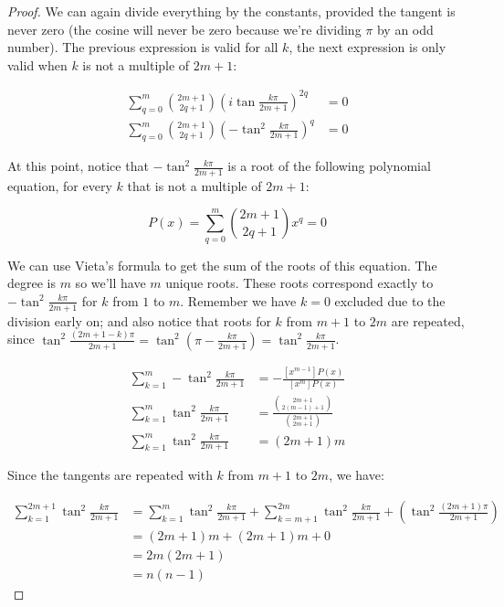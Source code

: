 \documentclass{letter}
\begin{document}
\begin{letter}{}
\begin{proof}
    We can again divide everything by the constants, provided the tangent is never zero (the cosine will never be zero because we're dividing $\pi$ by an odd number). The previous expression is valid for all $k$, the next expression is only valid when $k$ is not a multiple of $2m+1$:

  \begin{align*}
    \sum_{q=0}^{m}{2m+1\choose 2q+1}
      \left(i\tan\frac{k\pi}{2m+1}\right)^{2q} &=0 \\
    \sum_{q=0}^{m}{2m+1\choose 2q+1}
      \left(-\tan^2\frac{k\pi}{2m+1}\right)^{q} &=0 
  \end{align*}
       
  At this point, notice that $-\tan^2\frac{k\pi}{2m+1}$ is a root of the following polynomial equation, for every $k$ that is not a multiple of $2m+1$:
    
    $$P(x)=\sum_{q=0}^{m}{2m+1\choose 2q+1}x^q=0$$

  We can use Vieta's formula to get the sum of the roots of this equation. The degree is $m$ so we'll have $m$ unique roots. These roots correspond exactly to $-\tan^2\frac{k\pi}{2m+1}$ for $k$ from $1$ to $m$. Remember we have $k=0$ excluded due to the division early on; and also notice that roots for $k$ from $m+1$ to $2m$ are repeated, since $\tan^2\frac{(2m+1-k)\pi}{2m+1}=\tan^2\left(\pi-\frac{k\pi}{2m+1}\right)=\tan^2\frac{k\pi}{2m+1}$.

  \begin{align*}
    \sum_{k=1}^{m}-\tan^2\frac{k\pi}{2m+1}&=-\frac{[x^{m-1}]P(x)}{[x^m]P(x)}\\
    \sum_{k=1}^{m}\tan^2\frac{k\pi}{2m+1}
      &= \frac{{2m+1\choose 2(m-1)+1}}{{2m+1\choose 2m+1}} \\
    \sum_{k=1}^{m}\tan^2\frac{k\pi}{2m+1}
      &= (2m+1)m
  \end{align*}

  Since the tangents are repeated with $k$ from $m+1$ to $2m$, we have:

  \begin{align*}
    \sum_{k=1}^{2m+1}\tan^2\frac{k\pi}{2m+1}
      &=\sum_{k=1}^{m}\tan^2\frac{k\pi}{2m+1}
       +\sum_{k=m+1}^{2m}\tan^2\frac{k\pi}{2m+1}
       +\left(\tan^2\frac{(2m+1)\pi}{2m+1}\right)\\
      &=(2m+1)m + (2m+1)m + 0 \\
      &=2m(2m+1) \\
      &=n(n-1)
  \end{align*}


\end{proof}
\end{letter}
\end{document}

